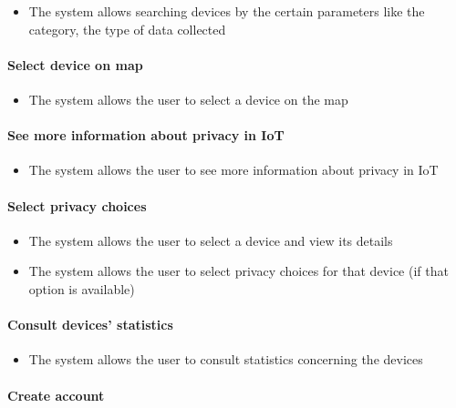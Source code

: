 \begin{itemize}
    \item The system allows searching devices by the certain parameters like the category, the type of data collected
\end{itemize}

\paragraph*{Select device on map}

\begin{itemize}
    \item The system allows the user to select a device on the map
\end{itemize}

\paragraph*{See more information about privacy in IoT}

\begin{itemize}
    \item The system allows the user to see more information about privacy in IoT
\end{itemize}

\paragraph*{Select privacy choices}

\begin{itemize}
    \item The system allows the user to select a device and view its details
    \item The system allows the user to select privacy choices for that device (if that option is available)
\end{itemize}

\paragraph*{Consult devices' statistics}

\begin{itemize}
    \item The system allows the user to consult statistics concerning the devices
\end{itemize}

\paragraph*{Create account}

